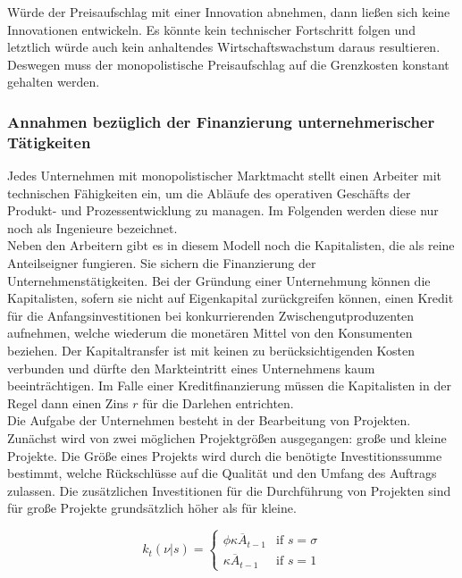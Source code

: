 Würde der Preisaufschlag mit einer Innovation abnehmen, dann lie{\ss}en sich keine Innovationen entwickeln. Es könnte kein technischer Fortschritt folgen und letztlich würde auch kein anhaltendes Wirtschaftswachstum daraus resultieren. Deswegen muss der monopolistische Preisaufschlag auf die Grenzkosten konstant gehalten werden.


\subsubsection{Annahmen bezüglich der Finanzierung unternehmerischer Tätigkeiten}
Jedes Unternehmen mit monopolistischer Marktmacht stellt einen Arbeiter mit technischen Fähigkeiten ein, um die Abläufe des operativen Geschäfts der Produkt- und Prozessentwicklung zu managen. Im Folgenden werden diese nur noch als Ingenieure bezeichnet. \\


Neben den Arbeitern gibt es in diesem Modell noch die Kapitalisten, die als reine Anteilseigner fungieren. Sie sichern die Finanzierung der Unternehmenstätigkeiten. Bei der Gründung einer Unternehmung können die Kapitalisten, sofern sie nicht auf Eigenkapital zurückgreifen können, einen Kredit für die Anfangsinvestitionen bei konkurrierenden Zwischengutproduzenten aufnehmen, welche wiederum die monetären Mittel von den Konsumenten beziehen. Der Kapitaltransfer ist mit keinen zu berücksichtigenden Kosten verbunden und dürfte den Markteintritt eines Unternehmens kaum beeinträchtigen. Im Falle einer Kreditfinanzierung müssen die Kapitalisten in der Regel dann einen Zins $r$ für die Darlehen entrichten.\\


Die Aufgabe der Unternehmen besteht in der Bearbeitung von Projekten.
Zunächst wird von zwei möglichen Projektgrö{\ss}en ausgegangen: gro{\ss}e und kleine Projekte. Die Grö{\ss}e eines Projekts wird durch die benötigte Investitionssumme bestimmt, welche Rückschlüsse auf die Qualität und den Umfang des Auftrags zulassen. Die zusätzlichen Investitionen für die Durchführung von Projekten sind für gro{\ss}e Projekte grundsätzlich höher als für kleine.

	\begin{equation}
		k_t(\nu|s)=\begin{cases}\phi\kappa\overline{A}_{t-1}& \text{if } s= \sigma\\
		\kappa\overline{A}_{t-1}
		& \text {if }  s=1\end{cases}
	\end{equation}

